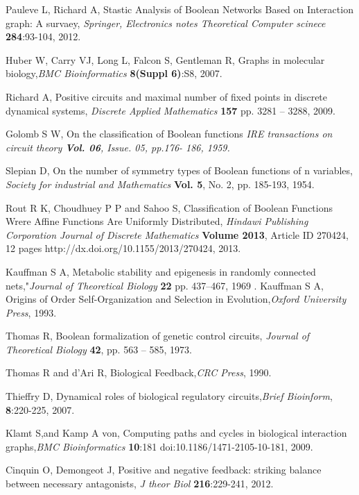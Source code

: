 \documentclass{article}
\begin{document}
\newpage
\begin{thebibliography}{1}
  Pauleve L, Richard A, Stastic Analysis of Boolean Networks Based on Interaction graph: A survaey, {\it Springer, Electronics notes Theoretical Computer scinece} {\bf 284}:93-104, 2012.
    
  Huber W, Carry VJ, Long L, Falcon S, Gentleman R, Graphs in molecular biology,{\it BMC Bioinformatics} {\bf 8(Suppl 6)}:S8, 2007.
 
  Richard A, Positive circuits and maximal number of fixed points in discrete dynamical systems, {\it Discrete Applied Mathematics} {\bf 157} pp. 3281 – 3288, 2009.
 
  Golomb S W, On the classification of Boolean functions \it{IRE transactions on circuit theory} {\bf Vol. 06}, Issue. 05, pp.176- 186, 1959.
  
   Slepian D, On the number of symmetry types of Boolean functions of n variables, {\it Society for industrial and Mathematics} {\bf Vol. 5}, No. 2, pp. 185-193, 1954.
  
   Rout R K, Choudhuey P P and Sahoo S, Classification of Boolean Functions Wrere Affine Functions Are Uniformly Distributed, {\it Hindawi Publishing Corporation
  Journal of Discrete Mathematics} {\bf Volume 2013}, Article ID 270424, 12 pages http://dx.doi.org/10.1155/2013/270424, 2013.
  
   Kauffman S A, Metabolic stability and epigenesis in randomly connected nets,"{\it Journal of Theoretical Biology} {\bf 22} pp. 437–467, 1969
  .
   Kauffman S A, Origins of Order Self-Organization and Selection in Evolution,{\it  Oxford University Press}, 1993.
  
  Thomas R, Boolean formalization of genetic control circuits, {\it Journal of Theoretical Biology} {\bf 42}, pp. 563 – 585, 1973.
  
  Thomas R and d’Ari R, Biological Feedback,{\it  CRC Press}, 1990.
  
   Thieffry D, Dynamical roles of biological regulatory circuits,{\it  Brief Bioinform}, {\bf 8}:220-225, 2007.
    
  
   Klamt S,and Kamp A von, Computing paths and cycles in biological interaction graphs,{\it BMC Bioinformatics} {\bf 10}:181 doi:10.1186/1471-2105-10-181, 2009.
  
   Cinquin O, Demongeot J, Positive and negative feedback: striking balance between necessary antagonists, {\it J theor Biol} {\bf 216}:229-241, 2012.
  

\end{thebibliography}
\end{document}
